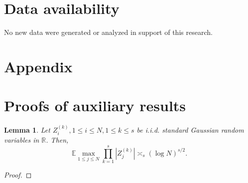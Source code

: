 \documentclass[numbers,webpdf,imaiai]{ima-authoring-template}
\theoremstyle{thmstyletwo}%
\newtheorem{lemma}[theorem]{Lemma}
\numberwithin{equation}{section}
\numberwithin{equation}{section}
\providecommand{\mathbbm}{\mathbb} %
\newcommand{\R}{\mathbbm{R}}
\newcommand{\E}{\mathbb{E}}
\begin{document}
\section*{Data availability}

No new data were generated or analyzed in support of this research.





\renewcommand{\theHsection}{A\arabic{section}}

\begin{appendix}

\section*{Appendix}
 
\section{Proofs of auxiliary results}\label{app:A}

\begin{lemma}\label{lemma:sup_Gaussian_products}
Let $Z^{(k)}_i, 1\le i\le N, 1\le k\le s$ be i.i.d. standard Gaussian random variables in $\R$. Then,
\[
\E  \max_{1\le j\le N} \prod_{k=1}^{s}|Z^{(k)}_j| \asymp_s (\log N)^{s/2}.
\]
\end{lemma}

\begin{proof}


\end{proof}
\end{appendix}
\end{document}
